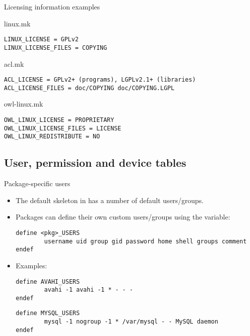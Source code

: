 \begin{frame}[fragile]{Licensing information examples}
  \begin{block}{linux.mk}
\begin{verbatim}
LINUX_LICENSE = GPLv2
LINUX_LICENSE_FILES = COPYING
\end{verbatim}
  \end{block}

\begin{block}{acl.mk}
\begin{verbatim}
ACL_LICENSE = GPLv2+ (programs), LGPLv2.1+ (libraries)
ACL_LICENSE_FILES = doc/COPYING doc/COPYING.LGPL
\end{verbatim}
\end{block}

\begin{block}{owl-linux.mk}
\begin{verbatim}
OWL_LINUX_LICENSE = PROPRIETARY
OWL_LINUX_LICENSE_FILES = LICENSE
OWL_LINUX_REDISTRIBUTE = NO
\end{verbatim}
\end{block}

\end{frame}

\subsection{User, permission and device tables}

\begin{frame}[fragile]{Package-specific users}

\begin{itemize}

\item The default skeleton in  has a number of
  default users/groups.
\item Packages can define their own custom users/groups using the
   variable:
{\footnotesize
  \begin{block}{}
\begin{verbatim}
define <pkg>_USERS
        username uid group gid password home shell groups comment
endef
\end{verbatim}
  \end{block}}
\item Examples:
  \begin{block}{}
    \begin{verbatim}
define AVAHI_USERS
        avahi -1 avahi -1 * - - -
endef
\end{verbatim}
\end{block}

\begin{block}{}
  \begin{verbatim}
define MYSQL_USERS
        mysql -1 nogroup -1 * /var/mysql - - MySQL daemon
endef
  \end{verbatim}
\end{block}
\end{itemize}

\end{frame}

